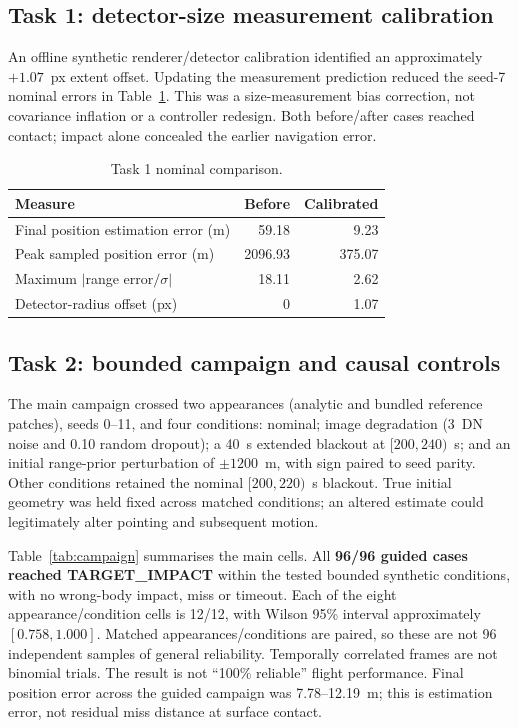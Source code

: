 \documentclass[11pt,a4paper]{article}
\begin{document}
\subsection{Task 1: detector-size measurement calibration}
An offline synthetic renderer/detector calibration identified an approximately $+1.07$~px extent offset. Updating the measurement prediction reduced the seed-7 nominal errors in Table~\ref{tab:calibration}. This was a size-measurement bias correction, not covariance inflation or a controller redesign. Both before/after cases reached contact; impact alone concealed the earlier navigation error.
\begin{table}[htbp]\centering
\caption{Task 1 nominal comparison.}\label{tab:calibration}
\begin{tabular}{lrr}\toprule
Measure & Before & Calibrated \\\midrule
Final position estimation error (m) & 59.18 & 9.23 \\
Peak sampled position error (m) & 2096.93 & 375.07 \\
Maximum $|$range error$/\sigma|$ & 18.11 & 2.62 \\
Detector-radius offset (px) & 0 & 1.07 \\\bottomrule
\end{tabular}
\end{table}

\subsection{Task 2: bounded campaign and causal controls}
The main campaign crossed two appearances (analytic and bundled reference patches), seeds 0--11, and four conditions: nominal; image degradation (3~DN noise and 0.10 random dropout); a 40~s extended blackout at $[200,240)$~s; and an initial range-prior perturbation of $\pm1200$~m, with sign paired to seed parity. Other conditions retained the nominal $[200,220)$~s blackout. True initial geometry was held fixed across matched conditions; an altered estimate could legitimately alter pointing and subsequent motion.

Table~\ref{tab:campaign} summarises the main cells. All \textbf{96/96 guided cases reached TARGET\_IMPACT} within the tested bounded synthetic conditions, with no wrong-body impact, miss or timeout. Each of the eight appearance/condition cells is 12/12, with Wilson 95\% interval approximately $[0.758,1.000]$. Matched appearances/conditions are paired, so these are not 96 independent samples of general reliability. Temporally correlated frames are not binomial trials. The result is not ``100\% reliable'' flight performance. Final position error across the guided campaign was 7.78--12.19~m; this is estimation error, not residual miss distance at surface contact.
\end{document}
